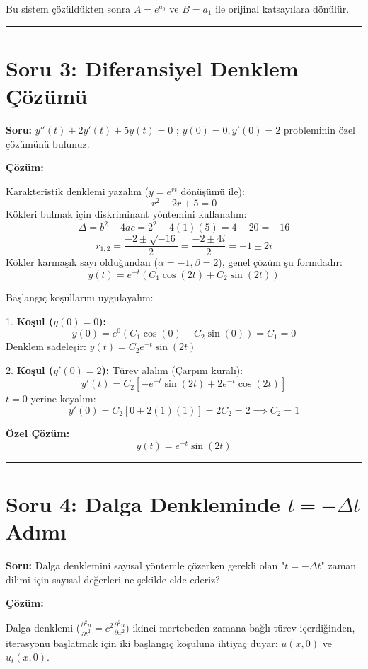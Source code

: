 \documentclass[a4paper,12pt]{article}
\begin{document}
Bu sistem çözüldükten sonra $A = e^{a_0}$ ve $B = a_1$ ile orijinal katsayılara dönülür.

\hrule
\vspace{0.5cm}

\section*{Soru 3: Diferansiyel Denklem Çözümü}

\textbf{Soru:} $y''(t) + 2y'(t) + 5y(t) = 0$ ; $y(0)=0, y'(0)=2$ probleminin özel çözümünü bulunuz.

\textbf{Çözüm:}

Karakteristik denklemi yazalım ($y = e^{rt}$ dönüşümü ile):
\[
r^2 + 2r + 5 = 0
\]
Kökleri bulmak için diskriminant yöntemini kullanalım:
\[
\Delta = b^2 - 4ac = 2^2 - 4(1)(5) = 4 - 20 = -16
\]
\[
r_{1,2} = \frac{-2 \pm \sqrt{-16}}{2} = \frac{-2 \pm 4i}{2} = -1 \pm 2i
\]
Kökler karmaşık sayı olduğundan ($\alpha = -1, \beta = 2$), genel çözüm şu formdadır:
\[
y(t) = e^{-t} (C_1 \cos(2t) + C_2 \sin(2t))
\]

Başlangıç koşullarını uygulayalım:

1. \textbf{Koşul ($y(0)=0$):}
\[
y(0) = e^{0} (C_1 \cos(0) + C_2 \sin(0)) = C_1 = 0
\]
Denklem sadeleşir: $y(t) = C_2 e^{-t} \sin(2t)$

2. \textbf{Koşul ($y'(0)=2$):}
Türev alalım (Çarpım kuralı):
\[
y'(t) = C_2 \left[ -e^{-t} \sin(2t) + 2e^{-t} \cos(2t) \right]
\]
$t=0$ yerine koyalım:
\[
y'(0) = C_2 \left[ 0 + 2(1)(1) \right] = 2C_2 = 2 \implies C_2 = 1
\]

\textbf{Özel Çözüm:}
\[
y(t) = e^{-t} \sin(2t)
\]

\hrule
\vspace{0.5cm}

\section*{Soru 4: Dalga Denkleminde $t=-\Delta t$ Adımı}

\textbf{Soru:} Dalga denklemini sayısal yöntemle çözerken gerekli olan "$t=-\Delta t$" zaman dilimi için sayısal değerleri ne şekilde elde ederiz?

\textbf{Çözüm:}

Dalga denklemi ($\frac{\partial^2 u}{\partial t^2} = c^2 \frac{\partial^2 u}{\partial x^2}$) ikinci mertebeden zamana bağlı türev içerdiğinden, iterasyonu başlatmak için iki başlangıç koşuluna ihtiyaç duyar: $u(x,0)$ ve $u_t(x,0)$.
\end{document}
